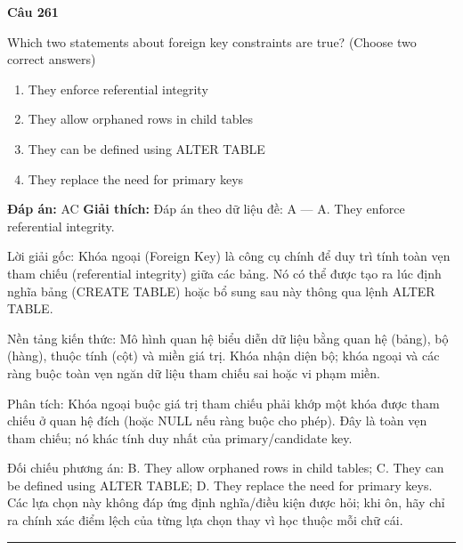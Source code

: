\documentclass[11pt,a4paper]{article}
\newenvironment{question}[1]{%
  \par\vspace{1em}\noindent\textbf{\large Câu #1}\par\vspace{0.4em}
}{%
  \par\vspace{1em}\hrule\vspace{0.6em}
}
\newenvironment{choices}{%
  \begin{enumerate}[label=\textbf{\Alph*.},leftmargin=2.2em,itemsep=2pt,topsep=3pt]
}{%
  \end{enumerate}
}
\newcommand{\choice}{\item}
\begin{document}
\begin{question}{261}
Which two statements about foreign key constraints are true? (Choose two correct answers)
\begin{choices}
\choice They enforce referential integrity
\choice They allow orphaned rows in child tables
\choice They can be defined using ALTER TABLE
\choice They replace the need for primary keys
\end{choices}
\textbf{Đáp án:} AC
\textbf{Giải thích:} Đáp án theo dữ liệu đề: A — A. They enforce referential integrity.

Lời giải gốc: Khóa ngoại (Foreign Key) là công cụ chính để duy trì tính toàn vẹn tham chiếu (referential integrity) giữa các bảng. Nó có thể được tạo ra lúc định nghĩa bảng (CREATE TABLE) hoặc bổ sung sau này thông qua lệnh ALTER TABLE.

Nền tảng kiến thức: Mô hình quan hệ biểu diễn dữ liệu bằng quan hệ (bảng), bộ (hàng), thuộc tính (cột) và miền giá trị. Khóa nhận diện bộ; khóa ngoại và các ràng buộc toàn vẹn ngăn dữ liệu tham chiếu sai hoặc vi phạm miền.

Phân tích: Khóa ngoại buộc giá trị tham chiếu phải khớp một khóa được tham chiếu ở quan hệ đích (hoặc NULL nếu ràng buộc cho phép). Đây là toàn vẹn tham chiếu; nó khác tính duy nhất của primary/candidate key.

Đối chiếu phương án: B. They allow orphaned rows in child tables; C. They can be defined using ALTER TABLE; D. They replace the need for primary keys. Các lựa chọn này không đáp ứng định nghĩa/điều kiện được hỏi; khi ôn, hãy chỉ ra chính xác điểm lệch của từng lựa chọn thay vì học thuộc mỗi chữ cái.
\end{question}
\end{document}
